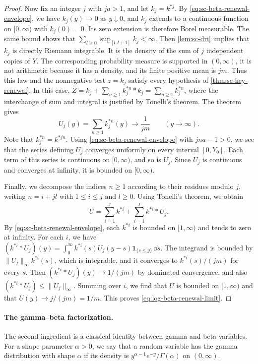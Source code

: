 \begin{proof}
Now fix an integer $j$ with $ja>1$, and let $k_j=k^{*j}$. By \eqref{eq:sc-beta-renewal-envelope}, we have $k_j(y)\to0$ as $y\downarrow0$, and $k_j$ extends to a continuous function on $[0,\infty)$ with $k_j(0)=0$. Its zero extension is therefore Borel measurable. The same bound shows that $\sum_{l\ge0}\sup_{[l,l+1]}k_j<\infty$. Then \cref{lem:sc-dri} implies that $k_j$ is directly Riemann integrable. It is the density of the sum of $j$ independent copies of $Y$. The corresponding probability measure is supported in $(0,\infty)$, it is not arithmetic because it has a density, and its finite positive mean is $jm$. Thus this law and the nonnegative test $z=k_j$ satisfy every hypothesis of \cref{thm:sc-key-renewal}. In this case, $Z=k_j+\sum_{n\ge1}k_j^{*n}*k_j=\sum_{n\ge1}k_j^{*n}$, where the interchange of sum and integral is justified by Tonelli's theorem. The theorem gives
\[
 U_j(y)=\sum_{n\ge1}k_j^{*n}(y)\longrightarrow\frac1{jm}\qquad(y\to\infty).
\]
Note that $k_j^{*n}=k^{*jn}$. Using \eqref{eq:sc-beta-renewal-envelope} with $jna-1>0$, we see that the series defining $U_j$ converges uniformly on every interval $[0,Y_0]$. Each term of this series is continuous on $[0,\infty)$, and so is $U_j$. Since $U_j$ is continuous and converges at infinity, it is bounded on $[0,\infty)$.

Finally, we decompose the indices $n\ge1$ according to their residues modulo $j$, writing $n=i+jl$ with $1\le i\le j$ and $l\ge0$. Using Tonelli's theorem, we obtain
\[
 U=\sum_{i=1}^j k^{*i}+\sum_{i=1}^j k^{*i}*U_j .
\]
By \eqref{eq:sc-beta-renewal-envelope}, each $k^{*i}$ is bounded on $[1,\infty)$ and tends to zero at infinity. For each $i$, we have $(k^{*i}*U_j)(y)=\int_0^\infty k^{*i}(s)U_j(y-s)\mathbf 1_{\{s\le y\}}\,\dd s$. The integrand is bounded by $\|U_j\|_\infty k^{*i}(s)$, which is integrable, and it converges to $k^{*i}(s)/(jm)$ for every $s$. Then $(k^{*i}*U_j)(y)\to1/(jm)$ by dominated convergence, and also $(k^{*i}*U_j)\le\|U_j\|_\infty$. Summing over $i$, we find that $U$ is bounded on $[1,\infty)$ and that $U(y)\to j/(jm)=1/m$. This proves \eqref{eq:log-beta-renewal-limit}.
\end{proof}

\paragraph{The gamma--beta factorization.} The second ingredient is a classical identity between gamma and beta variables. For a shape parameter $\alpha>0$, we say that a random variable has the gamma distribution with shape $\alpha$ if its density is $y^{\alpha-1}e^{-y}/\Gamma(\alpha)$ on $(0,\infty)$.

